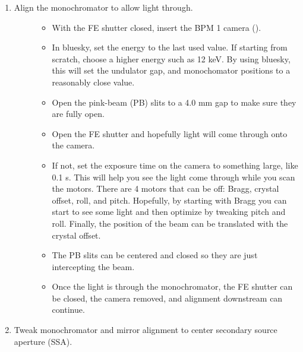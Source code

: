 \documentclass[letterpaper,10pt,english]{sphinxmanual}
\begin{document}
\begin{description}
\begin{enumerate}
\begin{description}
\begin{itemize}
\end{itemize}

\end{description}

\item {} \begin{description}
\item[{Align the monochromator to allow light through.}] \leavevmode\begin{itemize}
\item {} 
With the FE shutter closed, insert the BPM 1 camera ().

\item {} 
In bluesky, set the energy to the last used value. If starting from scratch, choose a higher energy such as 12 keV. By using bluesky, this will set the undulator gap, and monochomator positions to a reasonably close value.

\item {} 
Open the pink-beam (PB) slits to a 4.0 mm gap to make sure they are fully open.

\item {} 
Open the FE shutter and hopefully light will come through onto the camera.

\item {} 
If not, set the exposure time on the camera to something large, like 0.1 s. This will help you see the light come through while you scan the motors. There are 4 motors that can be off: Bragg, crystal offset, roll, and pitch. Hopefully, by starting with Bragg you can start to see some light and then optimize by tweaking pitch and roll. Finally, the position of the beam can be translated with the crystal offset.

\item {} 
The PB slits can be centered and closed so they are just intercepting the beam.

\item {} 
Once the light is through the monochromator, the FE shutter can be closed, the camera removed, and alignment downstream can continue.

\end{itemize}

\end{description}

\item {} 
Tweak monochromator and mirror alignment to center secondary source aperture (SSA).

\end{enumerate}

\end{description}
\end{document}
